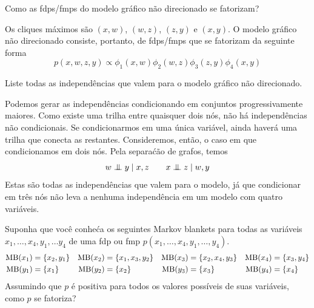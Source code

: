 \begin{exenumerate}
    
    \item Como as fdps/fmps do modelo gr\'afico n\~ao direcionado se fatorizam?
    
    \begin{solution}
        Os cliques m\'aximos s\~ao $(x, w)$, $(w, z)$, $(z, y)$ e $(x,
        y)$. O modelo gr\'afico n\~ao direcionado consiste, portanto, de fdps/fmps
        que se fatorizam da seguinte forma
        \begin{equation}
            p(x, w, z, y) \propto \phi_1(x,w) \phi_2(w,z) \phi_3(z,y) \phi_4(x,y)
        \end{equation}
        
    \end{solution}
    
    \item Liste todas as independ\^encias que valem para o modelo gr\'afico n\~ao direcionado.
    
    \begin{solution}
        Podemos gerar as independ\^encias condicionando em
        conjuntos progressivamente maiores. Como existe uma trilha entre quaisquer dois
        n\'os, n\~ao h\'a independ\^encias n\~ao condicionais. Se condicionarmos em
        uma \'unica vari\'avel, ainda haver\'a uma trilha que conecta as
        restantes. Consideremos, ent\~ao, o caso em que condicionamos em
        dois n\'os. Pela separa\'c\~ao de grafos, temos
        \begin{equation}
            w \mathrel{\perp\mspace{-10mu}\perp} y \mid x,z \quad \quad x \mathrel{\perp\mspace{-10mu}\perp} z \mid w,y
        \end{equation}
        Estas s\~ao todas as independ\^encias que valem para o modelo, j\'a que
        condicionar em tr\^es n\'os n\~ao leva a nenhuma independ\^encia em
        um modelo com quatro vari\'aveis.
    \end{solution}
    
    
\end{exenumerate}


\label{ex:factorisation-from-the-Markov-blankets-I}

Suponha que voc\^e conhe\'ca os seguintes Markov blankets para todas as vari\'aveis $x_1,
\ldots, x_4, y_1, \ldots y_4$ de uma fdp ou fmp $p(x_1, \ldots, x_4,
y_1, \ldots,y_4)$.
\begin{align}
    \textrm{MB}(x_1) &= \{x_2, y_1\} & \textrm{MB}(x_2)&=\{x_1, x_3, y_2\} & \textrm{MB}(x_3)&=\{x_2, x_4, y_3\} & \textrm{MB}(x_4)&=\{x_3, y_4\}\\
    \textrm{MB}(y_1) &= \{x_1\}      & \textrm{MB}(y_2)&= \{x_2\}          &  \textrm{MB}(y_3)&= \{x_3\}          &  \textrm{MB}(y_4) &= \{x_4\}
\end{align}
Assumindo que $p$ \'e positiva para todos os valores poss\'iveis
de suas vari\'aveis, como $p$ se fatoriza?


